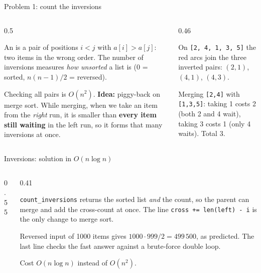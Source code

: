 \documentclass[aspectratio=169,10pt]{beamer}
\begin{document}
\begin{frame}{Problem 1: count the inversions}
\begin{columns}[T]
\begin{column}{0.5\textwidth}
{\small
An  is a pair of positions $i<j$ with $a[i]>a[j]$: two items in the wrong order. The number of inversions measures \emph{how unsorted} a list is (0 = sorted, $n(n-1)/2$ = reversed).

\vspace{2mm}
Checking all pairs is $O(n^2)$. \textbf{Idea:} piggy-back on merge sort. While merging, when we take an item from the \emph{right} run, it is smaller than \textbf{every item still waiting} in the left run, so it forms that many inversions at once.}
\end{column}
\begin{column}{0.46\textwidth}
\begin{sfig}[0.45]
\begin{tikzpicture}
  
\end{tikzpicture}
\end{sfig}
\vspace{1mm}
{\small
On \texttt{[2, 4, 1, 3, 5]} the red arcs join the three inverted pairs: $(2,1)$, $(4,1)$, $(4,3)$.

\vspace{2mm}
Merging \texttt{[2,4]} with \texttt{[1,3,5]}: taking 1 costs 2 (both 2 and 4 wait), taking 3 costs 1 (only 4 waits). Total 3.}
\end{column}
\end{columns}
\end{frame}

\begin{frame}{Inversions: solution in $O(n\log n)$}
\begin{columns}[T]
\begin{column}{0.55\textwidth}
\end{column}
\begin{column}{0.41\textwidth}
\vspace{2mm}
{\small
\texttt{count\_inversions} returns the sorted list \emph{and} the count, so the parent can merge and add the cross-count at once. The line \texttt{cross += len(left) - i} is the only change to merge sort.

\vspace{2mm}
Reversed input of 1000 items gives $1000\cdot999/2=499\,500$, as predicted. The last line checks the fast answer against a brute-force double loop.

\vspace{2mm}
Cost $O(n\log n)$ instead of $O(n^2)$.}
\end{column}
\end{columns}
\end{frame}
\end{document}
